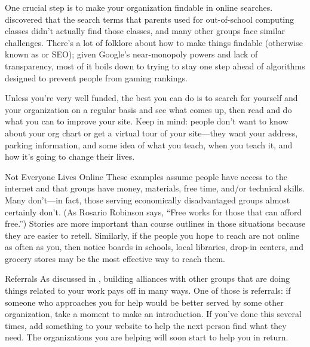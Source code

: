 One crucial step is to make your organization findable in online searches.
\cite{DiSa2014b} discovered that
the search terms that parents used for out-of-school computing classes
didn't actually find those classes,
and many other groups face similar challenges.
There's a lot of folklore about how to make things findable
(otherwise known as  or SEO);
given Google's near-monopoly powers and lack of transparency,
most of it boils down to trying to stay one step ahead of
algorithms designed to prevent people from gaming rankings.

Unless you're very well funded,
the best you can do is to search for yourself and your organization on a regular basis
and see what comes up,
then read 
and do what you can to improve your site.
Keep  in mind:
people don't want to know about your org chart or get a virtual tour of your site---they want your address,
parking information,
and some idea of what you teach,
when you teach it,
and how it's going to change their lives.

\begin{aside}{Not Everyone Lives Online}
  These examples assume people have access to the internet
  and that groups have money, materials, free time, and/or technical skills.
  Many don't---in fact,
  those serving economically disadvantaged groups almost certainly don't.
  (As Rosario Robinson says, ``Free works for those that can afford free.'')
  Stories are more important than course outlines in those situations
  because they are easier to retell.
  Similarly,
  if the people you hope to reach are not online as often as you,
  then notice boards in schools,
  local libraries,
  drop-in centers,
  and grocery stores may be the most effective way to reach them.
\end{aside}

\begin{aside}{Referrals}
  As discussed in ,
  building alliances with other groups that are doing things related to your work
  pays off in many ways.
  One of those is referrals:
  if someone who approaches you for help would be better served by some other organization,
  take a moment to make an introduction.
  If you've done this several times,
  add something to your website to help the next person find what they need.
  The organizations you are helping will soon start to help you in return.
\end{aside}

